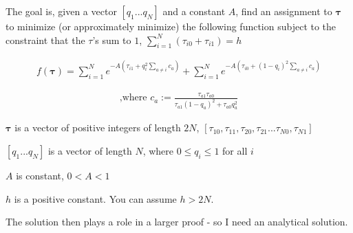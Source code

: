 \documentclass{article}
\newcommand{\eqn}[1]{\begin{align}#1\end{align}}
\theoremstyle{plain}
\theoremstyle{definition}
\begin{document}
\def\ci{\perp\!\!\!\perp}



The goal is, given a vector $[q_1...q_N]$ and a constant $A$, find an assignment to $\boldsymbol{\tau}$ to minimize (or approximately minimize) the following function subject to the constraint that the $\tau$'s sum to $1$, $\sum_{i=1}^N(\tau_{i0}+\tau_{i1}) = h$

\eqn{
f(\boldsymbol{\tau}) =  \sum_{i=1}^N e^{-A ( \tau_{i1} + q_{i}^2 \sum_{a \neq i} c_a  )}+\sum_{i=1}^N e^{-A ( \tau_{i0} + (1-q_{i})^2 \sum_{a \neq i} c_a)}
}

\eqn{
\text{,where }c_a :=  \frac{\tau_{a1}\tau_{a0}}{\tau_{a1}(1-q_a)^2+\tau_{a0}q_a^2}
}

$\boldsymbol{\tau}$ is a vector of positive integers of length $2N$, $[\tau_{10},\tau_{11},\tau_{20},\tau_{21}...\tau_{N0},\tau_{N1}]$

$[q_1...q_N]$ is a vector of length $N$, where $0 \leq q_i \leq 1$ for all $i$

$A$ is constant, $0 < A < 1$

$h$ is a positive constant. You can assume $h > 2N$.

The solution then plays a role in a larger proof - so I need an analytical solution.
\end{document}
